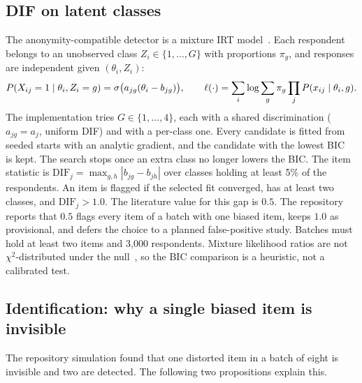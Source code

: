 \subsection{DIF on latent classes}

The anonymity-compatible detector is a mixture IRT model~\cite{rost1990,cohen2005mixture}. Each
respondent belongs to an unobserved class $Z_i\in\{1,\dots,G\}$ with proportions $\pi_g$, and
responses are independent given $(\theta_i,Z_i)$:
\begin{equation}\label{eq:mixture}
  P(X_{ij}=1\mid\theta_i,Z_i=g)=\sigma\bigl(a_{jg}(\theta_i-b_{jg})\bigr),\qquad
  \ell(\cdot)=\sum_i\log\sum_g\pi_g\prod_j P(x_{ij}\mid\theta_i,g).
\end{equation}
The implementation tries $G\in\{1,\dots,4\}$, each with a shared discrimination
($a_{jg}=a_j$, uniform DIF) and with a per-class one. Every candidate is fitted from seeded
starts with an analytic gradient, and the candidate with the lowest
BIC~\cite{schwarz1978} is kept. The search stops once an extra class no longer lowers the BIC.
The item statistic is $\mathrm{DIF}_j=\max_{g,h}|b_{jg}-b_{jh}|$ over classes holding at least 5\%
of the respondents. An item is flagged if the selected fit converged, has at least two classes,
and $\mathrm{DIF}_j>1.0$. The literature value for this gap is $0.5$. The repository reports
that $0.5$ flags every item of a batch with one biased item, keeps $1.0$ as provisional, and
defers the choice to a planned false-positive study. Batches must hold at least two items and
3{,}000 respondents. Mixture likelihood ratios are not $\chi^2$-distributed under the
null~\cite{self1987,mclachlan2000}, so the BIC comparison is a heuristic, not a calibrated test.

\subsection{Identification: why a single biased item is invisible}

The repository simulation found that one distorted item in a batch of eight is invisible and
two are detected. The following two propositions explain this.

